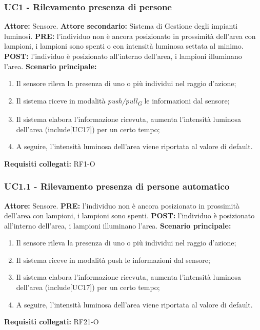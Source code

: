 \documentclass[a4paper, 12pt]{article}
\begin{document}
\subsubsection{UC1 - Rilevamento presenza di persone}
\textbf{Attore:} Sensore.\newline
\textbf{Attore secondario:} Sistema di Gestione degli impianti luminosi.\newline
\textbf{PRE:} l'individuo non è ancora posizionato in prossimità dell'area con lampioni, i lampioni sono spenti o con intensità luminosa settata al minimo.\newline
\textbf{POST:} l'individuo è posizionato all'interno dell'area, i lampioni illuminano l'area.\newline
\textbf{Scenario principale:}
\begin{enumerate}
    \item Il sensore rileva la presenza di uno o più individui nel raggio d'azione;
    \item Il sistema riceve in modalità \textit{push/pull\textsubscript{G}} le informazioni dal sensore;
    \item Il sistema elabora l'informazione ricevuta, aumenta l'intensità luminosa dell'area (include[UC17]) per un certo tempo;
    \item A seguire, l'intensità luminosa dell'area viene riportata al valore di default.
\end{enumerate}
\textbf{Requisiti collegati:} RF1-O\newline 

\subsubsection{UC1.1 - Rilevamento presenza di persone automatico}
\textbf{Attore:} Sensore.\newline
\textbf{PRE:} l'individuo non è ancora posizionato in prossimità dell'area con lampioni, i lampioni sono spenti.\newline
\textbf{POST:} l'individuo è posizionato all'interno dell'area, i lampioni illuminano l'area.\newline
\textbf{Scenario principale:}
\begin{enumerate}
    \item Il sensore rileva la presenza di uno o più individui nel raggio d'azione;
    \item Il sistema riceve in modalità push le informazioni dal sensore;
    \item Il sistema elabora l'informazione ricevuta, aumenta l'intensità luminosa dell'area (include[UC17]) per un certo tempo;
    \item A seguire, l'intensità luminosa dell'area viene riportata al valore di default.
\end{enumerate}
\textbf{Requisiti collegati:} RF21-O\newline
\end{document}
